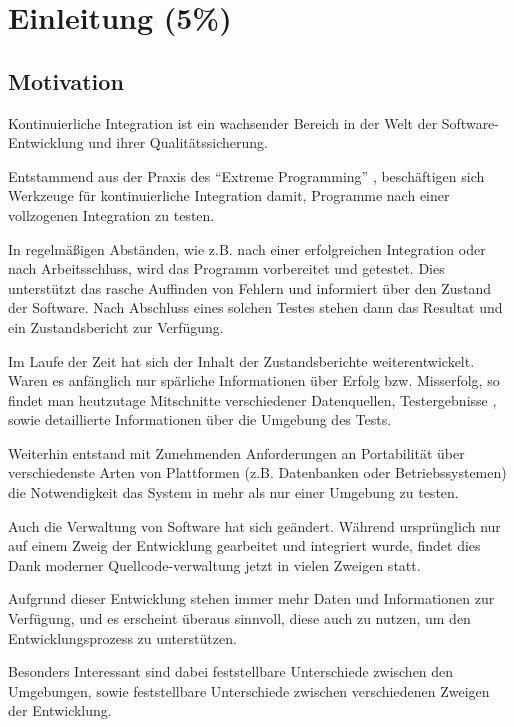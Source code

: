 \chapter{Einleitung (5\%) }
\label{chap:intro}
\section{Motivation}

Kontinuierliche Integration ist ein wachsender Bereich
in der Welt der Software-Entwicklung und ihrer Qualitätssicherung.

Entstammend aus der Praxis des ``Extreme Programming''
\cite{xp:explained, folwer:xp},
beschäftigen sich Werkzeuge für kontinuierliche Integration damit,
Programme nach einer vollzogenen Integration zu testen.

In regelmäßigen Abständen, wie z.B. nach einer erfolgreichen Integration oder nach Arbeitsschluss,
wird das Programm vorbereitet und getestet.
Dies unterstützt das rasche Auffinden von Fehlern
und informiert über den Zustand der Software.
Nach Abschluss eines solchen Testes stehen dann das Resultat
und ein Zustandsbericht zur Verfügung.

Im Laufe der Zeit hat sich der Inhalt der Zustandsberichte weiterentwickelt.
Waren es anfänglich nur spärliche Informationen über Erfolg bzw. Misserfolg,
so findet man heutzutage Mitschnitte verschiedener Datenquellen, Testergebnisse
\cite{jenkins:junitxml}, sowie detaillierte Informationen über die Umgebung des Tests.

Weiterhin entstand mit Zunehmenden Anforderungen an Portabilität über
verschiedenste Arten von Plattformen (z.B. Datenbanken oder Betriebssystemen)
die Notwendigkeit das System in mehr als nur einer Umgebung zu testen.

Auch die Verwaltung von Software hat sich geändert.
Während ursprünglich nur auf einem Zweig der Entwicklung gearbeitet und integriert wurde,
findet dies Dank moderner Quellcode-verwaltung jetzt in vielen Zweigen statt.
\cite{dvcs:vorteile, dvcs:entwicklungsmodelle}

Aufgrund dieser Entwicklung stehen immer mehr Daten und Informationen zur Verfügung,
und es erscheint überaus sinnvoll, diese auch zu nutzen, um den Entwicklungsprozess zu unterstützen.

Besonders Interessant sind dabei feststellbare Unterschiede zwischen den Umgebungen,
sowie feststellbare Unterschiede zwischen verschiedenen Zweigen der Entwicklung.


